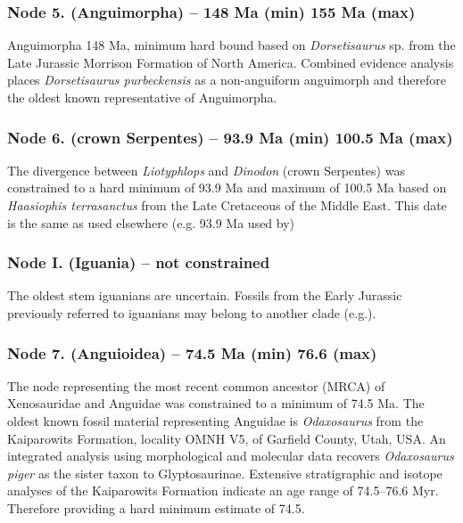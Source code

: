 \documentclass[a4paper, 12pt]{article}
\begin{document}
\subsubsection*{Node 5. (Anguimorpha) – 148 Ma (min) 155 Ma (max)}
Anguimorpha 148 Ma, minimum hard bound based on \textit{Dorsetisaurus} sp. from the Late Jurassic Morrison Formation of North America\cite{prothero1980late,evans1999upper,conrad2008phylogeny,jones2013integration}. Combined evidence analysis places \textit{Dorsetisaurus purbeckensis} as a non-anguiform anguimorph and therefore the oldest known representative of Anguimorpha\cite{conrad2011combined}.
 
\subsubsection*{Node 6. (crown Serpentes) – 93.9 Ma (min) 100.5 Ma (max)}
The divergence between \textit{Liotyphlops} and \textit{Dinodon} (crown Serpentes) was constrained to a hard minimum of 93.9 Ma and maximum of 100.5 Ma based on \textit{Haasiophis terrasanctus} from the Late Cretaceous of the Middle East\cite{tchernov2000fossil,rieppel2003anatomy}. This date is the same as used elsewhere (e.g. 93.9 Ma used by\cite{head2015fossil,hsiang2015origin})
 
\subsubsection*{Node I. (Iguania) – not constrained}
The oldest stem iguanians are uncertain\cite{bolet2013fossil}. Fossils from the Early Jurassic previously referred to iguanians may belong to another clade (e.g.\cite{jones2013integration}).
 
\subsubsection*{Node 7. (Anguioidea) – 74.5 Ma (min) 76.6 (max)}
The node representing the most recent common ancestor (MRCA) of Xenosauridae and Anguidae was constrained to a minimum of 74.5 Ma. The oldest known fossil material representing Anguidae is \textit{Odaxosaurus}\cite{nydam2013lizards} from the Kaiparowits Formation, locality OMNH V5, of Garfield County, Utah, USA. An integrated analysis using morphological and molecular data recovers \textit{Odaxosaurus piger} as the sister taxon to Glyptosaurinae\cite{conrad2011combined}. Extensive stratigraphic and isotope analyses of the Kaiparowits Formation indicate an age range of 74.5–76.6 Myr\cite{roberts200540ar,roberts2013kaiparowits}. Therefore providing a hard minimum estimate of 74.5. 
 
\end{document}
